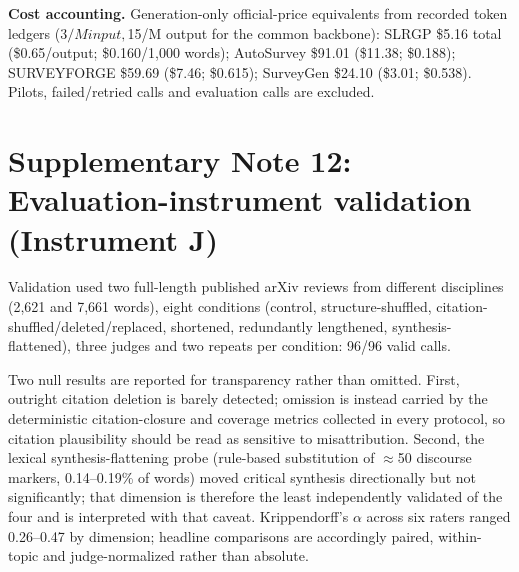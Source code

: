 \documentclass[11pt,a4paper]{article}
\newcommand{\snote}[1]{\section*{Supplementary Note #1}}
\begin{document}
\textbf{Cost accounting.} Generation-only official-price equivalents from recorded token ledgers ($3/M input, $15/M output for the common backbone): SLRGP \$5.16 total (\$0.65/output; \$0.160/1,000 words); AutoSurvey \$91.01 (\$11.38; \$0.188); SURVEYFORGE \$59.69 (\$7.46; \$0.615); SurveyGen \$24.10 (\$3.01; \$0.538). Pilots, failed/retried calls and evaluation calls are excluded.

\snote{12: Evaluation-instrument validation (Instrument J)}

Validation used two full-length published arXiv reviews from different disciplines (2,621 and 7,661 words), eight conditions (control, structure-shuffled, citation-shuffled/deleted/replaced, shortened, redundantly lengthened, synthesis-flattened), three judges and two repeats per condition: 96/96 valid calls.

\begin{table}[h]
\caption*{\textbf{Supplementary Table 7.} Instrument sensitivity probes (difference from control on the targeted dimension).}
\centering
\footnotesize
\setlength{\tabcolsep}{4pt}
\end{table}

Two null results are reported for transparency rather than omitted. First, outright citation deletion is barely detected; omission is instead carried by the deterministic citation-closure and coverage metrics collected in every protocol, so citation plausibility should be read as sensitive to misattribution. Second, the lexical synthesis-flattening probe (rule-based substitution of $\approx$50 discourse markers, 0.14--0.19\% of words) moved critical synthesis directionally but not significantly; that dimension is therefore the least independently validated of the four and is interpreted with that caveat. Krippendorff's $\alpha$ across six raters ranged 0.26--0.47 by dimension; headline comparisons are accordingly paired, within-topic and judge-normalized rather than absolute.
\end{document}
